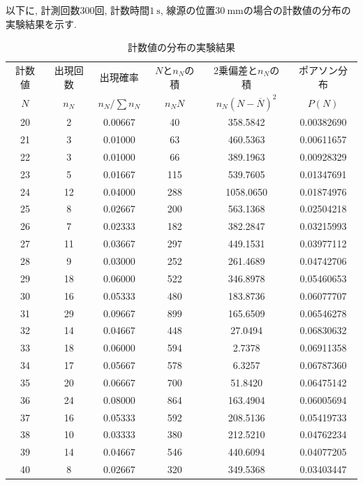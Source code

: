 \documentclass{jarticle}
\begin{document}
以下に, 計測回数$300$回, 計数時間$1\ \mathrm{s}$, 線源の位置$30\ \mathrm{mm}$の場合の計数値の分布の実験結果を示す.

\begin{table}[H]
  \centering
  \caption{計数値の分布の実験結果}
  \label{tb:count-distribution-30mm-300times}
  \begin{tabular}{cccccc}
    \hline
    計数値 & 出現回数 & 出現確率 & $N$と$n_N$の積 & 2乗偏差と$n_N$の積 & ポアソン分布 \\
    $N$ & $n_N$ & $n_N/\sum n_N$ & $n_N N$ & $n_N(N-\overline{N})^2$ & $P(N)$ \\
    \hline
    20 & 2 & 0.00667 & 40 & 358.5842 & 0.00382690 \\
    21 & 3 & 0.01000 & 63 & 460.5363 & 0.00611657 \\
    22 & 3 & 0.01000 & 66 & 389.1963 & 0.00928329 \\
    23 & 5 & 0.01667 & 115 & 539.7605 & 0.01347691 \\
    24 & 12 & 0.04000 & 288 & 1058.0650 & 0.01874976 \\
    25 & 8 & 0.02667 & 200 & 563.1368 & 0.02504218 \\
    26 & 7 & 0.02333 & 182 & 382.2847 & 0.03215993 \\
    27 & 11 & 0.03667 & 297 & 449.1531 & 0.03977112 \\
    28 & 9 & 0.03000 & 252 & 261.4689 & 0.04742706 \\
    29 & 18 & 0.06000 & 522 & 346.8978 & 0.05460653 \\
    30 & 16 & 0.05333 & 480 & 183.8736 & 0.06077707 \\
    31 & 29 & 0.09667 & 899 & 165.6509 & 0.06546278 \\
    32 & 14 & 0.04667 & 448 & 27.0494 & 0.06830632 \\
    33 & 18 & 0.06000 & 594 & 2.7378 & 0.06911358 \\
    34 & 17 & 0.05667 & 578 & 6.3257 & 0.06787360 \\
    35 & 20 & 0.06667 & 700 & 51.8420 & 0.06475142 \\
    36 & 24 & 0.08000 & 864 & 163.4904 & 0.06005694 \\
    37 & 16 & 0.05333 & 592 & 208.5136 & 0.05419733 \\
    38 & 10 & 0.03333 & 380 & 212.5210 & 0.04762234 \\
    39 & 14 & 0.04667 & 546 & 440.6094 & 0.04077205 \\
    40 & 8 & 0.02667 & 320 & 349.5368 & 0.03403447 \\

\end{tabular}
\end{table}
\end{document}

